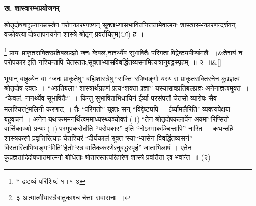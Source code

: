 \documentclass[article,12pt,a4paper]{memoir}
\begin{document}
	

	  \begin{center}%
	\textbf{ख. शास्त्रारम्भप्रयोजनम्}
	\end{center}
	

	  \pstart श्रोतृदोषबाहुल्याच्छास्त्रेण परोपकारमपश्यन् सूक्ताभ्यासभावितचित्ततामेवात्मनः शास्त्रारम्भकारणन्दर्शयन् वक्रोक्त्या दोषतापनयनेन शास्त्रे श्रोतृन् प्रवर्तयितुम(ा) ह ।
	\pend
      
	  \bigskip
	  \begingroup
	
	    \large
	  
	    
	    \stanza[\smallbreak]
	\footnote{\label{pvv.2-asterisk}  * द्रष्टव्यं परिशिष्टं १।१-४} प्रायः प्राकृतसक्तिरप्रतिबलप्रज्ञो जनः केवलं,नानर्थ्येव सुभाषितैः परिगता विद्वेष्ट्यपीर्ष्यामलैः ।&तेनायं न परोपकार इति नश्चिन्तापि चेतस्ततः,सूक्ताभ्यासविबर्द्धितव्यसनमित्यत्रानुबद्धस्पृहम् ॥ २ ॥\&[\smallbreak]


	
	  \endgroup
	

	   भूयान् बाहुल्येन वा {\color{DodgerBlue3}“जनः प्राकृतेषु”} बहिःशास्त्रेषु {\color{DodgerBlue3}“सक्ति”}रभिष्वङ्गो यस्य स प्राकृतसक्तिरनेन कुप्रज्ञत्वं श्रोतृदोष उक्तः । {\color{DodgerBlue3}“अप्रतिबला”} शास्त्रार्थग्रहणं प्रत्य{\color{DodgerBlue3}“शक्ता प्रज्ञा”} यस्यासावप्रतिबलप्रज्ञः अनेनाज्ञत्वमुक्तं । {\color{DodgerBlue3}“केवलं, नानर्थ्येव सूभाषितैः”} । किन्तु सुभाषिताभिधायिनं ईर्ष्या परसंपत्तौ चेतसो व्यारोषः सैव मलश्चित्त\footnote{\label{pvv.2-3}  ३ आत्मात्मीयास्त्रैधातुकाश्च चैत्ताः सवासनाः ।}मलिनी\leavevmode{} करणात् । तैः {\color{DodgerBlue3}“परिगतो”} युक्तः सन् {\color{DodgerBlue3}“विद्वेष्ट्यपि । ईर्ष्यामलैरिति”} व्यक्त्यपेक्षया बहुवचनं । अनेन यथाक्रममनर्थित्वममाध्यस्थ्यञ्चोक्तं (।) {\color{DodgerBlue3}“तेन श्रोतृदोषकलार्पेन अयमा”}रिप्सितो वार्त्तिकाख्यो ग्रन्थः (।) परमुपकरोतीति {\color{DodgerBlue3}“परोपकार”} इति {\color{DodgerBlue3}“नोऽस्माकञ्चिन्तापि”} नास्ति । कथन्तर्हि शास्त्रकरणे प्रवृत्तिरित्याह चेतश्चिरं {\color{DodgerBlue3}“दीर्घकालं \leavevmode{} सूक्त”}स्या{\color{DodgerBlue3}“भ्यासेन विवर्द्धितव्यसनं”} विस्तारिताभिष्वङ्ग{\color{DodgerBlue3}“मिति”}हेतो{\color{DodgerBlue3}“रत्र वार्तिककरणेऽनुबद्धस्पृहं”} जाताभिलाषं । एतेन कुप्रज्ञतादिदोषजातमात्मनो बोधिताः श्रोतारस्तत्परिहारेण शास्त्रे प्रवर्तिता एव भवन्ति ॥ (२)
	\pend
      
	  
	
\end{document}
